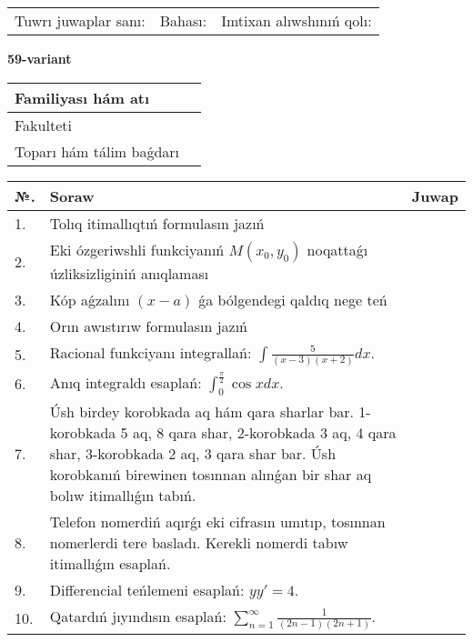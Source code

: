 \documentclass{article}
\begin{document}
\vspace{1cm}

\begin{tabular}{ c c c }
Tuwrı juwaplar sanı: \underline{\hspace{2cm}} & Bahası: \underline{\hspace{2cm}} & Imtixan alıwshınıń qolı: \underline{\hspace{2cm}} \\
\end{tabular}

\newpage

\begin{center}\textbf{59-variant}\end{center}

\bgroup
\def\arraystretch{1.5}
\begin{tabular}{ |m{6cm}|m{10cm}| }
  \hline
  Familiyası hám atı & \\
  \hline
  Fakulteti &\\
  \hline
  Toparı hám tálim baǵdarı & \\
  \hline
\end{tabular}
\egroup

\vspace{0.5cm}

\bgroup
\def\arraystretch{2}
\begin{tabular}{ |l|m{8cm}|m{7cm}| }
  \hline
  №. & Soraw & Juwap \\
  \hline
  1. & Tolıq itimallıqtıń formulasın jazıń &  \\
  \hline
  2. & Eki ózgeriwshli funkciyanıń $M(x_{0} , y_{0})$ noqattaǵı úzliksizliginiń anıqlaması &  \\
  \hline
  3. & Kóp aǵzalını $(x - a)$ ǵa bólgendegi qaldıq nege teń &  \\
  \hline
  4. & Orın awıstırıw formulasın jazıń &  \\
  \hline
  5. & Racional funkciyanı integrallań: $\displaystyle\int {\frac{5}{(x - 3)(x + 2)}dx}$. &  \\
  \hline
  6. & Anıq integraldı esaplań: $\displaystyle\int_{0}^{\frac{\pi}{2}}\cos xdx$. &  \\
  \hline
  7. & Úsh birdey korobkada aq hám qara sharlar bar. 1-korobkada 5 aq, 8 qara shar, 2-korobkada 3 aq, 4 qara shar, 3-korobkada 2 aq, 3 qara shar bar. Úsh korobkanıń birewinen tosınnan alınǵan bir shar aq bolıw itimallıǵın tabıń. &  \\
  \hline
  8. & Telefon nomerdiń aqırǵı eki cifrasın umıtıp, tosınnan nomerlerdi tere basladı. Kerekli nomerdi tabıw itimallıǵın esaplań. &  \\
  \hline
  9. & Differencial teńlemeni esaplań: $yy'= 4$. &  \\
  \hline
  10. & Qatardıń jıyındısın esaplań: $\displaystyle\sum_{n = 1}^{\infty}\frac{1}{(2n - 1)(2n + 1)}$. &  \\
  \hline
\end{tabular}
\egroup
\end{document}

